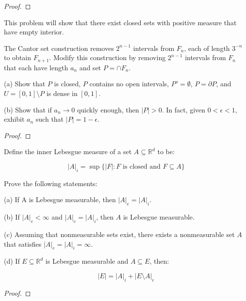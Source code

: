 \documentclass[10pt]{article}
\newenvironment{problem}[2][Problem]{\begin{trivlist}
\item[\hskip \labelsep {\bfseries #1}\hskip \labelsep {\bfseries #2.}]}{\end{trivlist}}
\begin{document}
\begin{proof}[Proof]

\end{proof}

\begin{problem}{2.2.42}
This problem will show that there exist closed sets with positive measure that have empty interior.

The Cantor set construction removes $2^{n-1}$ intervals from $F_n$, each of length $3^{-n}$ to obtain $F_{n+1}$. Modify this construction by removing $2^{n-1}$ intervals from $F_n$ that each have length $a_n$ and set $P = \cap F_n$.

(a) Show that $P$ is closed, $P$ contains no open intervals, $P^o = \emptyset$, $P = \partial P$, and $U = [0,1] \setminus P$ is dense in $[0,1]$.

(b) Show that if $a_n \rightarrow 0$ quickly enough, then $|P| > 0$. In fact, given $0 < \epsilon < 1$, exhibit $a_n$ such that $|P| = 1-\epsilon$.
\end{problem}

\begin{proof}[Proof]

\end{proof}

\begin{problem}{2.2.43}
Define the inner Lebesgue measure of a set $A \subseteq \mathbb{R}^d$ to be:

$$ |A|_i = \sup\{|F| : F \text{ is closed and } F \subseteq A \}$$

Prove the following statements:

(a) If A is Lebesgue measurable, then $|A|_e = |A|_i$.

(b) If $|A|_e < \infty$ and $|A|_e = |A|_i$, then $A$ is Lebesgue measurable.

(c) Assuming that nonmeasurable sets exist, there exists a nonmeasurable set $A$ that satisfies $|A|_e = |A|_i = \infty$.

(d) If $E \subseteq \mathbb{R}^d$ is Lebesgue measurable and $A \subseteq E$, then:

$$ |E| = |A|_i + |E \setminus A|_e$$
\end{problem}

\begin{proof}[Proof]

\end{proof}
\end{document}
